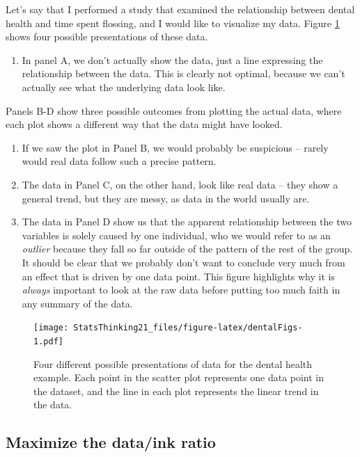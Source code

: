 \documentclass[
  12pt,
]{book}
\providecommand{\tightlist}{%
  \setlength{\itemsep}{0pt}\setlength{\parskip}{0pt}}
\begin{document}
Let's say that I performed a study that examined the relationship between dental health and time spent flossing, and I would like to visualize my data. Figure \ref{fig:dentalFigs} shows four possible presentations of these data.

\begin{enumerate}
\def\labelenumi{\arabic{enumi}.}
\tightlist
\item
  In panel A, we don't actually show the data, just a line expressing the relationship between the data. This is clearly not optimal, because we can't actually see what the underlying data look like.
\end{enumerate}

Panels B-D show three possible outcomes from plotting the actual data, where each plot shows a different way that the data might have looked.

\begin{enumerate}
\def\labelenumi{\arabic{enumi}.}
\setcounter{enumi}{1}
\tightlist
\item
  If we saw the plot in Panel B, we would probably be suspicious -- rarely would real data follow such a precise pattern.\\
\item
  The data in Panel C, on the other hand, look like real data -- they show a general trend, but they are messy, as data in the world usually are.\\
\item
  The data in Panel D show us that the apparent relationship between the two variables is solely caused by one individual, who we would refer to as an \emph{outlier} because they fall so far outside of the pattern of the rest of the group. It should be clear that we probably don't want to conclude very much from an effect that is driven by one data point. This figure highlights why it is \emph{always} important to look at the raw data before putting too much faith in any summary of the data.
\end{enumerate}

\begin{figure}
\centering
\texttt{[image: StatsThinking21\_files/figure-latex/dentalFigs-1.pdf]}
\caption{\label{fig:dentalFigs}Four different possible presentations of data for the dental health example. Each point in the scatter plot represents one data point in the dataset, and the line in each plot represents the linear trend in the data.}
\end{figure}

\hypertarget{maximize-the-dataink-ratio}{%
\subsection{Maximize the data/ink ratio}\label{maximize-the-dataink-ratio}}
\end{document}
